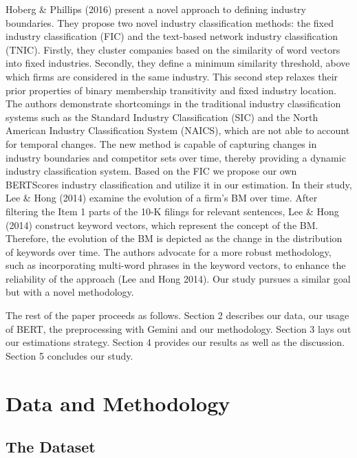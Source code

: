 \documentclass[
]{article}
\begin{document}
Hoberg \& Phillips (2016) present a novel approach to defining industry
boundaries. They propose two novel industry classification methods: the
fixed industry classification (FIC) and the text-based network industry
classification (TNIC). Firstly, they cluster companies based on the
similarity of word vectors into fixed industries. Secondly, they define
a minimum similarity threshold, above which firms are considered in the
same industry. This second step relaxes their prior properties of binary
membership transitivity and fixed industry location. The authors
demonstrate shortcomings in the traditional industry classification
systems such as the Standard Industry Classification (SIC) and the North
American Industry Classification System (NAICS), which are not able to
account for temporal changes. The new method is capable of capturing
changes in industry boundaries and competitor sets over time, thereby
providing a dynamic industry classification system. Based on the FIC we
propose our own BERTScores industry classification and utilize it in our
estimation. In their study, Lee \& Hong (2014) examine the evolution of
a firm's BM over time. After filtering the Item 1 parts of the 10-K
filings for relevant sentences, Lee \& Hong (2014) construct keyword
vectors, which represent the concept of the BM. Therefore, the evolution
of the BM is depicted as the change in the distribution of keywords over
time. The authors advocate for a more robust methodology, such as
incorporating multi-word phrases in the keyword vectors, to enhance the
reliability of the approach (Lee and Hong 2014). Our study pursues a
similar goal but with a novel methodology.

The rest of the paper proceeds as follows. Section 2 describes our data,
our usage of BERT, the preprocessing with Gemini and our methodology.
Section 3 lays out our estimations strategy. Section 4 provides our
results as well as the discussion. Section 5 concludes our study.

\section{Data and Methodology}\label{data-and-methodology}

\subsection{The Dataset}\label{the-dataset}
\end{document}
